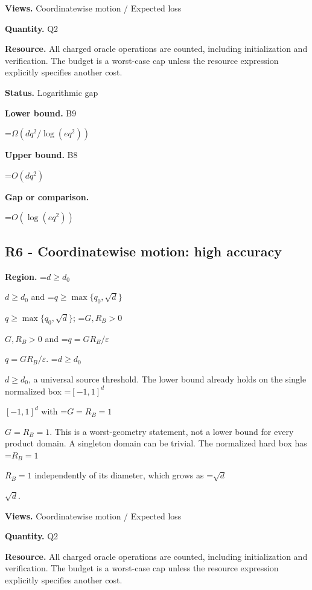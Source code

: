 \documentclass[10pt,a4paper]{article}
\newcommand{\AtlasMath}[1]{\par\begingroup\centering\setbox0=\hbox{$\displaystyle #1$}\ifdim\wd0>1.4\linewidth\typeout{ATLAS WIDE FORMULA: \the\wd0}\fi\ifdim\wd0>\linewidth\resizebox{\linewidth}{!}{\box0}\else\box0\fi\par\endgroup}
\newcommand{\AtlasInlineMath}[1]{\begingroup\setbox0=\hbox{$#1$}\ifdim\wd0>.4\linewidth\endgroup\AtlasMath{#1}\else\endgroup$#1$\fi}
\begin{document}
\textbf{Views.} Coordinatewise motion / Expected loss



\textbf{Quantity.} Q2



\textbf{Resource.} All charged oracle operations are counted, including initialization and verification. The budget is a worst-case cap unless the resource expression explicitly specifies another cost.



\textbf{Status.} Logarithmic gap



\textbf{Lower bound.} B9



\AtlasMath{\Omega(dq^2/\log(eq^2))}


\textbf{Upper bound.} B8



\AtlasMath{O(dq^2)}


\textbf{Gap or comparison.}



\AtlasMath{O(\log(eq^2))}


\subsection{R6 - Coordinatewise motion: high accuracy}


\textbf{Region.} \AtlasInlineMath{d\ge d_0} and \AtlasInlineMath{q\ge\max\{q_0,\sqrt d\}}; \AtlasInlineMath{G,R_B>0} and \AtlasInlineMath{q=GR_B/\varepsilon}. \AtlasInlineMath{d\ge d_0}, a universal source threshold. The lower bound already holds on the single normalized box \AtlasInlineMath{[-1,1]^d} with \AtlasInlineMath{G=R_B=1}. This is a worst-geometry statement, not a lower bound for every product domain. A singleton domain can be trivial. The normalized hard box has \AtlasInlineMath{R_B=1} independently of its diameter, which grows as \AtlasInlineMath{\sqrt d}.



\textbf{Views.} Coordinatewise motion / Expected loss



\textbf{Quantity.} Q2



\textbf{Resource.} All charged oracle operations are counted, including initialization and verification. The budget is a worst-case cap unless the resource expression explicitly specifies another cost.
\end{document}
